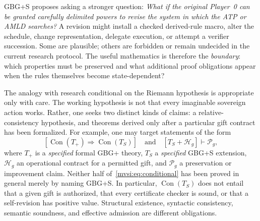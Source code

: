 \documentclass[11pt,letterpaper]{article}
\theoremstyle{definition}\newtheorem{definition}[theorem]{Definition}\newtheorem{example}[theorem]{Example}
\theoremstyle{remark}\newtheorem{remark}[theorem]{Remark}
\newcommand{\Con}{\operatorname{Con}}
\begin{document}
GBG+S proposes asking a stronger question: \emph{What if the original Player~0 can be granted carefully delimited powers to revise the system in which the ATP or AMLD searches?} A revision might install a checked derived-rule macro, alter the schedule, change representation, delegate execution, or attempt a verifier succession. Some are plausible; others are forbidden or remain undecided in the current research protocol. The useful mathematics is therefore the \emph{boundary}: which properties must be preserved and what additional proof obligations appear when the rules themselves become state-dependent?

The analogy with research conditional on the Riemann hypothesis is appropriate only with care. The working hypothesis is not that every imaginable sovereign action works. Rather, one seeks two distinct kinds of claims: a relative-consistency hypothesis, and theorems derived only after a particular gift contract has been formalized. For example, one may target statements of the form
\begin{equation}\label{mvsi:eq:conditional}
\left[\Con(T_{+})\Rightarrow\Con(T_{S})\right]
\quad\text{and}\quad
\left[T_S+\mathcal H_g\right]\vdash\mathcal P_g,
\end{equation}
where $T_{+}$ is a \emph{specified} formal GBG+ theory, $T_S$ a \emph{specified} GBG+S extension, $\mathcal H_g$ an operational contract for a permitted gift, and $\mathcal P_g$ a preservation or improvement claim. Neither half of~\eqref{mvsi:eq:conditional} has been proved in general merely by naming GBG+S. In particular, $\Con(T_S)$ does not entail that a given gift is authorized, that every certificate checker is sound, or that a self-revision has positive value. Structural existence, syntactic consistency, semantic soundness, and effective admission are different obligations.
\end{document}

